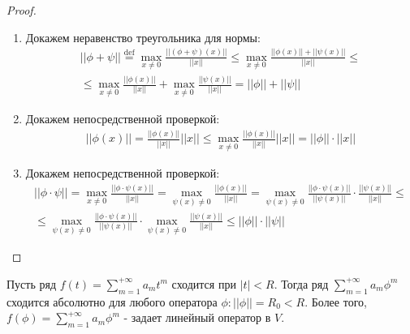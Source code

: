 \begin{proof}~
    \begin{enumerate}
        \item Докажем неравенство треугольника для нормы:
        \begin{multline*}
            ||\phi + \psi|| \overset{\text{def}}{=} \underset{x \neq 0}{\max} 
            \frac{||(\phi + \psi)(x)||}{||x||} \leq \underset{x \neq 0}{\max} 
            \frac{||\phi(x)|| + ||\psi(x)||}{||x||} \leq \\ \leq \underset{x \neq 0}{\max} 
            \frac{||\phi(x)||}{||x||} + \underset{x \neq 0}{\max} 
            \frac{||\psi(x)||}{||x||} = ||\phi|| + ||\psi||
        \end{multline*} 

        \item Докажем непосредственной проверкой:
        \begin{eqnarray*}
            ||\phi(x)|| = \frac{||\phi(x)||}{||x||} ||x|| \leq  \underset{x \neq 0}{\max} 
            \frac{||\phi(x)||}{||x||} ||x|| = ||\phi|| \cdot ||x||
        \end{eqnarray*}
        \item Докажем непосредственной проверкой:
        \begin{multline*}
            ||\phi \cdot \psi|| = \underset{x \neq 0}{\max} \frac{||\phi \cdot \psi(x)||}{||x||} = 
            \underset{\psi(x) \neq 0}{\max} \frac{||\phi(x)||}{||x||} =
            \underset{\psi(x) \neq 0}{\max} \frac{||\phi \cdot \psi(x)||}{||\psi(x)||} \cdot 
            \frac{||\psi(x)||}{||x||} \leq \\ \leq \underset{\psi(x) \neq 0}{\max} 
            \frac{||\phi \cdot \psi(x)||}{||\psi(x)||} \cdot \underset{\psi(x) \neq 0}{\max} 
            \frac{||\psi(x)||}{||x||} \leq ||\phi|| \cdot ||\psi||
        \end{multline*}
    \end{enumerate}
\end{proof}

\begin{theorem}
    Пусть ряд $f(t) = \displaystyle\sum_{m=1}^{+\infty} a_m t^m$ сходится при $|t| < R$.
    Тогда ряд $\displaystyle\sum_{m=1}^{+\infty} a_m \phi^m$ сходится абсолютно для любого оператора 
    $\phi: ||\phi|| = R_0 < R$. Более того, $f(\phi) = \displaystyle\sum_{m=1}^{+\infty} a_m \phi^m$ 
    - задает линейный оператор в $V$.
\end{theorem}

